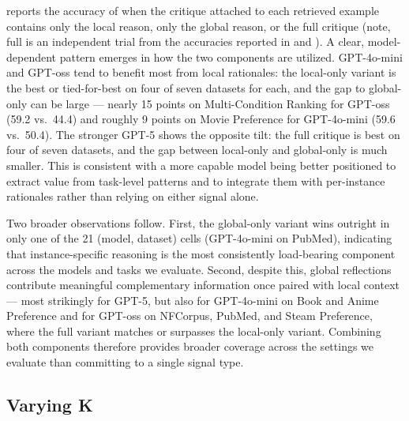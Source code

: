  reports the accuracy of \EPCRIT{} when the critique attached to each retrieved example contains only the local reason, only the global reason, or the full critique (note, full is an independent trial from the accuracies reported in  and ). A clear, model-dependent pattern emerges in how the two components are utilized. GPT-4o-mini and GPT-oss tend to benefit most from local rationales: the local-only variant is the best or tied-for-best on four of seven datasets for each, and the gap to global-only can be large --- nearly 15 points on Multi-Condition Ranking for GPT-oss (59.2 vs.\ 44.4) and roughly 9 points on Movie Preference for GPT-4o-mini (59.6 vs.\ 50.4). The stronger GPT-5 shows the opposite tilt: the full critique is best on four of seven datasets, and the gap between local-only and global-only is much smaller. This is consistent with a more capable model being better positioned to extract value from task-level patterns and to integrate them with per-instance rationales rather than relying on either signal alone.

Two broader observations follow. First, the global-only variant wins outright in only one of the 21 (model, dataset) cells (GPT-4o-mini on PubMed), indicating that instance-specific reasoning is the most consistently load-bearing component across the models and tasks we evaluate. Second, despite this, global reflections contribute meaningful complementary information once paired with local context --- most strikingly for GPT-5, but also for GPT-4o-mini on Book and Anime Preference and for GPT-oss on NFCorpus, PubMed, and Steam Preference, where the full variant matches or surpasses the local-only variant. Combining both components therefore provides broader coverage across the settings we evaluate than committing to a single signal type.


\subsection{Varying K}
\label{varying_k}



